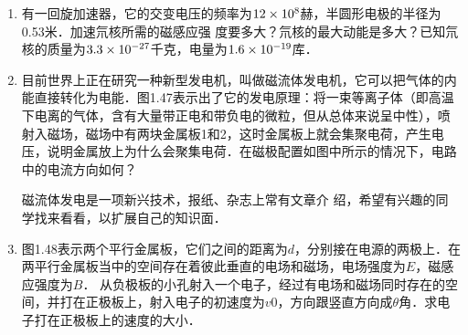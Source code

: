 \begin{enumerate}
\begin{solution}

\end{solution}

\item  有一回旋加速器，它的交变电压的频率为$12\times10^8$赫，半圆形电极的半径为0.53米．加速氘核所需的磁感应强
度要多大？氘核的最大动能是多大？已知氘核的质量为$3.3\times10^{-27}$千克，电量为$1.6\times10^{-19}$库．


\begin{solution}

\end{solution}

\item 目前世界上正在研究一种新型发电机，叫做磁流体发电机，它可以把气体的内能直接转化为电能．图1.47表示出了它的发电原理：将一束等离子体（即高温下电离的气体，含有大量带正电和带负电的微粒，但从总体来说呈中性），喷射入磁场，磁场中有两块金属板1和2，这时金属板上就会集聚电荷，产生电压，说明金属放上为什么会聚集电荷．在磁极配置如图中所示的情况下，电路中的电流方向如何？

磁流体发电是一项新兴技术，报纸、杂志上常有文章介
绍，希望有兴趣的同学找来看看，以扩展自己的知识面．


\begin{solution}

\end{solution}

\item  图1.48表示两个平行金属板，它们之间的距离为$d$，分别接在电源的两极上．在两平行金属板当中的空间存在着彼此垂直的电场和磁场，电场强度为$E$，磁感应强度为$B$． 从负极板的小孔射入一个电子，经过有电场和磁场同时存在的空间，并打在正极板上，射入电子的初速度为$v0$，方向跟竖直方向成$\theta$角．求电子打在正极板上的速度的大小．

\begin{figure}[htp]\centering
	\caption{ }
\end{figure}\begin{figure}[htp]\centering
\caption{ }
\end{figure}


\begin{solution}

\end{solution}

\end{enumerate}



















